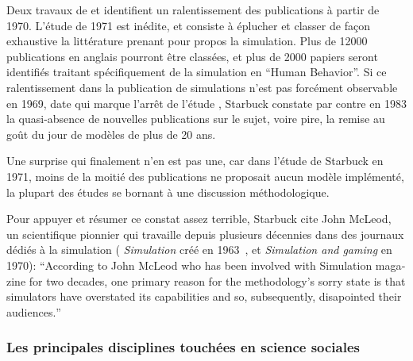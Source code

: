 Deux travaux de \textcite{Dutton1971} et \textcite{Starbuck1983} identifient un ralentissement des publications à partir de 1970. L'étude de 1971 est inédite, et consiste à éplucher et classer de façon exhaustive la littérature prenant pour propos la simulation. Plus de 12000 publications en anglais pourront être classées, et plus de 2000 papiers seront identifiés traitant spécifiquement de la simulation en \foreignquote{english}{Human Behavior}. Si ce ralentissement dans la publication de simulations n'est pas forcément observable en 1969, date qui marque l'arrêt de l'étude , Starbuck constate par contre en 1983 la quasi-absence de nouvelles publications sur le sujet, voire pire, la remise au goût du jour de modèles de plus de 20 ans.

Une surprise qui finalement n'en est pas une, car dans l'étude de Starbuck en 1971, moins de la moitié des publications ne proposait aucun modèle implémenté, la plupart des études se bornant à une discussion méthodologique.

Pour appuyer et résumer ce constat assez terrible, Starbuck cite John McLeod, un scientifique pionnier qui travaille depuis plusieurs décennies dans des journaux dédiés à la simulation ( \textit{Simulation} créé en 1963 , et \textit{Simulation and gaming} en 1970): \foreignquote{english}{According to  John McLeod who has been involved with Simulation magazine for two decades, one primary reason for the methodology's sorry state is that simulators have overstated its capabilities and so, subsequently, disapointed their audiences.}

\subsubsection{Les principales disciplines touchées en science sociales}
\label{ssec:disciplines_touches}


